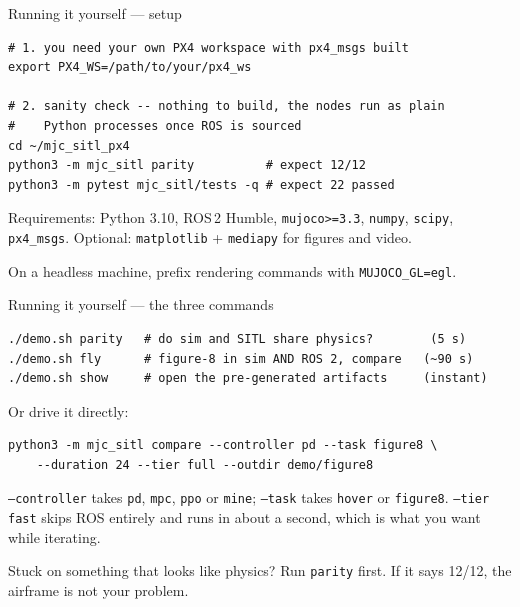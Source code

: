 \documentclass[aspectratio=169,11pt]{beamer}
\begin{document}
\begin{frame}[fragile]{Running it yourself --- setup}
\begin{lstlisting}
# 1. you need your own PX4 workspace with px4_msgs built
export PX4_WS=/path/to/your/px4_ws

# 2. sanity check -- nothing to build, the nodes run as plain
#    Python processes once ROS is sourced
cd ~/mjc_sitl_px4
python3 -m mjc_sitl parity          # expect 12/12
python3 -m pytest mjc_sitl/tests -q # expect 22 passed
\end{lstlisting}

  \vspace{0.3cm}
  {\small Requirements: Python 3.10, ROS\,2 Humble, \texttt{mujoco>=3.3},
  \texttt{numpy}, \texttt{scipy}, \texttt{px4\_msgs}. Optional:
  \texttt{matplotlib} + \texttt{mediapy} for figures and video.}

  \vspace{0.2cm}
  {\small On a headless machine, prefix rendering commands with
  \texttt{MUJOCO\_GL=egl}.}
\end{frame}

\begin{frame}[fragile]{Running it yourself --- the three commands}
\begin{lstlisting}
./demo.sh parity   # do sim and SITL share physics?        (5 s)
./demo.sh fly      # figure-8 in sim AND ROS 2, compare   (~90 s)
./demo.sh show     # open the pre-generated artifacts     (instant)
\end{lstlisting}

  \vspace{0.3cm}
  Or drive it directly:

\begin{lstlisting}
python3 -m mjc_sitl compare --controller pd --task figure8 \
    --duration 24 --tier full --outdir demo/figure8
\end{lstlisting}

  \vspace{0.25cm}
  {\small \texttt{--controller} takes \texttt{pd}, \texttt{mpc}, \texttt{ppo} or
  \texttt{mine}; \texttt{--task} takes \texttt{hover} or \texttt{figure8}.
  \texttt{--tier fast} skips ROS entirely and runs in about a second, which is
  what you want while iterating.}

  \vspace{0.25cm}
  {\small Stuck on something that looks like physics? Run \texttt{parity}
  first. If it says 12/12, the airframe is not your problem.}
\end{frame}
\end{document}
